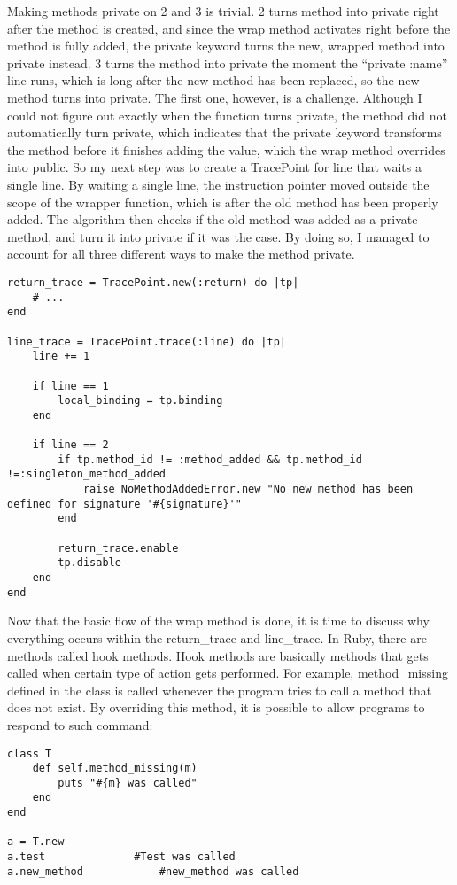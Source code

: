 Making methods private on 2 and 3 is trivial.  2 turns method into private right after the method is created, and since the wrap method activates right before the method is fully added, the private keyword turns the new, wrapped method into private instead.  3 turns the method into private the moment the ``private :name'' line runs, which is long after the new method has been replaced, so the new method turns into private.  The first one, however, is a challenge.  Although I could not figure out exactly when the function turns private, the method did not automatically turn private, which indicates that the private keyword transforms the method before it finishes adding the value, which the wrap method overrides into public.  So my next step was to create a TracePoint for line that waits a single line.  By waiting a single line, the instruction pointer moved outside the scope of the wrapper function, which is after the old method has been properly added.  The algorithm then checks if the old method was added as a private method, and turn it into private if it was the case.  By doing so, I managed to account for all three different ways to make the method private.

\begin{lstlisting}[caption={The other TracePoints}]
return_trace = TracePoint.new(:return) do |tp|
    # ...
end

line_trace = TracePoint.trace(:line) do |tp|
    line += 1

    if line == 1
        local_binding = tp.binding
    end

    if line == 2
        if tp.method_id != :method_added && tp.method_id !=:singleton_method_added
            raise NoMethodAddedError.new "No new method has been defined for signature '#{signature}'"
        end

        return_trace.enable
        tp.disable
    end
end
\end{lstlisting}

Now that the basic flow of the wrap method is done, it is time to discuss why everything occurs within the return\_trace and line\_trace.  In Ruby, there are methods called hook methods.  Hook methods are basically methods that gets called when certain type of action gets performed.  For example, method\_missing defined in the class is called whenever the program tries to call a method that does not exist.  By overriding this method, it is possible to allow programs to respond to such command:

\begin{lstlisting}[caption={method\_missing example}]
class T
    def self.method_missing(m)
    	puts "#{m} was called"
    end
end

a = T.new
a.test				#Test was called
a.new_method			#new_method was called
\end{lstlisting}

